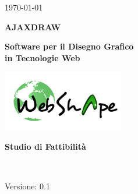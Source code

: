 
\title{\TITOLODOC}
\author{Geremia Mirco}



\renewcommand{\insertversion}{0.1} %
\renewcommand{\TITOLODOC}{Studio di Fattibilit\`{a}} %
\renewcommand{\glosspath}{.\glossario} %

\begin{titlepage}
\begin{center}
	\begin{Large}	\today \end{Large}
\end{center}

\vspace{20pt}

\begin{center}
	\begin{Huge}
				\textbf{AJAXDRAW}
	\end{Huge}
\end{center}			

\begin{center}
	\begin{large}
				\textbf{Software per il Disegno Grafico\\ in Tecnologie Web}
	\end{large}
\end{center}			

\vspace{20pt}

\begin{center}
\includegraphics[width=150pt]{../logo/logo}
\end{center}

\vspace{170pt}
\begin{center} %
	\begin{Huge}
				\textbf{\TITOLODOC}
	\end{Huge}
			\\
\end{center}
\vspace{210pt}
\begin{center}
Versione: \insertversion
\end{center}
\end{titlepage}

